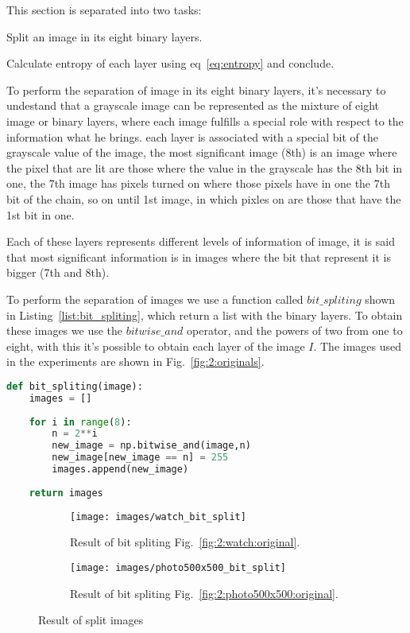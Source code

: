 \documentclass[journal]{IEEEtran}
\begin{document}
This section is separated into two tasks:
\begin{enumerate*}
	\item Split an image in its eight binary layers.
	\item Calculate entropy of each layer using eq~\ref{eq:entropy} and conclude.
\end{enumerate*}

To perform the separation of image in its eight binary layers, it's necessary to undestand that a grayscale image can be represented as the mixture of eight image or binary layers, where each image fulfills a special role with respect to the information what he brings. each layer is associated with a special bit of the grayscale value of the image, the most significant image (8th) is an image where the pixel that are lit are those where the value in the grayscale has the 8th bit in one, the 7th image has pixels turned on where those pixels have in one the 7th bit of the chain, so on until 1st image, in which pixles on are those that have the 1st bit in one.

Each of these layers represents different levels of information of image, it is said that most significant information is in images where the bit that represent it is bigger (7th and 8th).

To perform the separation of images we use a function called $bit\_spliting$ shown in Listing~\ref{list:bit_spliting}, which return a list with the binary layers. To obtain these images we use the $bitwise\_and$ operator, and the powers of two from one to eight, with this it's possible to obtain each layer of the image $I$. The images used in the experiments are shown in Fig.~\ref{fig:2:originals}.


\begin{lstlisting}[language=Python, caption=Bit spliting, label=list:bit_spliting]
def bit_spliting(image):
	images = []
	
	for i in range(8):
		n = 2**i
		new_image = np.bitwise_and(image,n)
		new_image[new_image == n] = 255
		images.append(new_image)
	
	return images
\end{lstlisting}

\begin{figure}
	\centering
	\begin{subfigure}{0.45\textwidth}
		\centering
		\texttt{[image: images/watch\_bit\_split]} 
		\caption{Result of bit spliting Fig.~\ref{fig:2:watch:original}.}
		\label{fig:watch:bit_split}
	\end{subfigure}

	\centering
	\begin{subfigure}{0.45\textwidth}
		\centering
		\texttt{[image: images/photo500x500\_bit\_split]} 
		
		\caption{Result of bit spliting Fig.~\ref{fig:2:photo500x500:original}.}
		\label{fig:photo500x500:bit_split}
	\end{subfigure}
	
	\caption{Result of split images}
	\label{fig:bit_split}
	
\end{figure}
\end{document}

